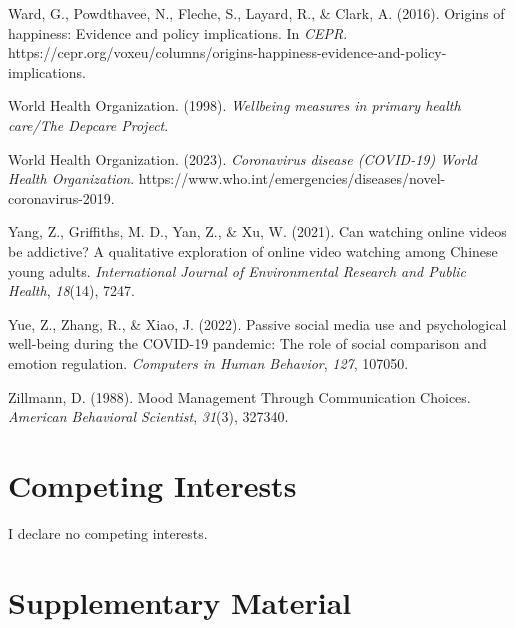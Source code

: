 \documentclass[
  man,mask,floatsintext]{apa7}
\newlength{\cslhangindent}
\newlength{\cslentryspacingunit} %
\newenvironment{CSLReferences}[2] %
 {%
  \setlength{\parindent}{0pt}
  \ifodd #1
  \let\oldpar\par
  \def\par{\hangindent=\cslhangindent\oldpar}
  \fi
  \setlength{\parskip}{#2\cslentryspacingunit}
 }%
 {}
\begin{document}
\begin{CSLReferences}{1}{0}
\leavevmode{}%
Ward, G., Powdthavee, N., Fleche, S., Layard, R., \& Clark, A. (2016). Origins of happiness: {Evidence} and policy implications. In \emph{CEPR}. https://cepr.org/voxeu/columns/origins-happiness-evidence-and-policy-implications.

\leavevmode{}%
World Health Organization. (1998). \emph{Wellbeing measures in primary health care/{The Depcare Project}}.

\leavevmode{}%
World Health Organization. (2023). \emph{Coronavirus disease ({COVID-19}) \textendash{} {World Health Organization}}. https://www.who.int/emergencies/diseases/novel-coronavirus-2019.

\leavevmode{}%
Yang, Z., Griffiths, M. D., Yan, Z., \& Xu, W. (2021). Can watching online videos be addictive? {A} qualitative exploration of online video watching among {Chinese} young adults. \emph{International Journal of Environmental Research and Public Health}, \emph{18}(14), 7247.

\leavevmode{}%
Yue, Z., Zhang, R., \& Xiao, J. (2022). Passive social media use and psychological well-being during the {COVID-19} pandemic: {The} role of social comparison and emotion regulation. \emph{Computers in Human Behavior}, \emph{127}, 107050.

\leavevmode{}%
Zillmann, D. (1988). Mood {Management Through Communication Choices}. \emph{American Behavioral Scientist}, \emph{31}(3), 327340.

\end{CSLReferences}

\hypertarget{competing-interests}{%
\section{Competing Interests}\label{competing-interests}}

I declare no competing interests.

\hypertarget{supplementary-material}{%
\section{Supplementary Material}\label{supplementary-material}}
\end{document}
